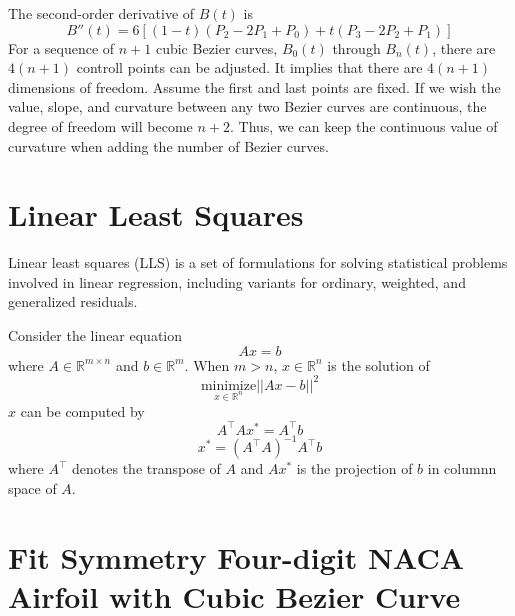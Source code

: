 \documentclass{turgon}
\begin{document}
The second-order derivative of $B(t)$ is
\begin{equation*}
    B''(t) = 6\left[(1-t)(P_2 - 2P_1 + P_0) + t(P_3 - 2P_2 + P_1)\right]
\end{equation*}
For a sequence of $n+1$ cubic Bezier curves, $B_0(t)$ through $B_n(t)$,
there are $4(n+1)$ controll points can be adjusted. It implies that there
are $4(n+1)$ dimensions of freedom. Assume the first and last points are
fixed. If we wish the value, slope, and curvature between any two Bezier
curves are continuous, the degree of freedom will become $n+2$. Thus, we
can keep the continuous value of curvature when adding the number of Bezier
curves.

\chapter{Linear Least Squares}


Linear least squares (LLS) is a set of formulations for solving statistical
problems involved in linear regression, including variants for ordinary,
weighted, and generalized residuals.

Consider the linear equation
\begin{equation}
    Ax = b
    \label{e:lls:leq}
\end{equation}
where $A \in \mathbb{R}^{m \times n}$ and $b \in \mathbb{R}^m$. When $m>n$,
$x \in \mathbb{R}^n$ is the solution of
\begin{equation*}
    \underset{x \in \mathbb{R}^n}{\text{minimize}} ||A x - b||^2
\end{equation*}
$x$ can be computed by
\begin{equation*}
    A^\top A x^* = A^\top b
\end{equation*}
\begin{equation*}
    x^* = (A^\top A)^{-1} A^\top b
    \label{e:lls:sol}
\end{equation*}
where $A^\top$ denotes the transpose of $A$ and $Ax^*$ is the projection of
$b$ in columnn space of $A$.

\chapter{Fit Symmetry Four-digit NACA Airfoil with Cubic Bezier Curve}
\end{document}
